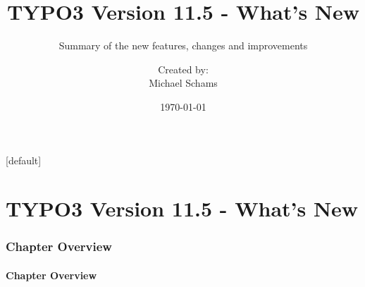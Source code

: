 \documentclass[t]{beamer}
\title{TYPO3 Version 11.5 - What's New}
\subtitle{Summary of the new features, changes and improvements}
\author{
	\centerline{Created by:}
	\centerline{Michael Schams}
}
\date{\today}
\begin{document}
\sharefont


\begingroup
	[default]
	\begin{frame}
		\titlepage
	\end{frame}
\endgroup


\section*{TYPO3 Version 11.5 - What's New}
\begin{frame}[fragile]
	\frametitle{Chapter Overview}
	\framesubtitle{Chapter Overview}

	\tableofcontents

\end{frame}













% 






\end{document}
